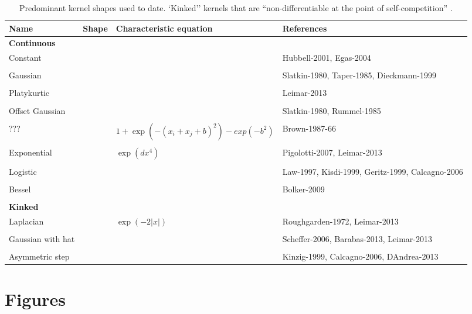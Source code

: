 \documentclass[a4paper,11pt]{article}
\begin{document}
\begin{table}[h]
 \caption{Predominant kernel shapes used to date.
`Kinked'' kernels that are ``non-differentiable at the point of
self-competition'' \citep{Barabas-2012}.}
\centering
{\footnotesize
  \begin{tabular}{p{3cm}p{4cm}p{3cm}p{4cm}}
  \hline
  Name & Shape & Characteristic equation & References \\
  \hline
  \multicolumn{4}{l}{\textbf{Continuous}} \\
  Constant & & & Hubbell-2001, Egas-2004 \\ \\
  Gaussian & & & Slatkin-1980, Taper-1985,
  Dieckmann-1999\\ \\
  Platykurtic & & &  Leimar-2013 \\ \\
  Offset Gaussian & & & Slatkin-1980, Rummel-1985\\ \\
  ??? & & $1 + \exp(-(x_i + x_j + b)^2) - exp(-b^2)$ & Brown-1987-66 \\ \\
  Exponential & & $\exp(dx^4)$ &Pigolotti-2007, Leimar-2013\\ \\
  Logistic & & & Law-1997, Kisdi-1999, Geritz-1999, Calcagno-2006\\ \\
  Bessel & & & Bolker-2009\\ \\
 \multicolumn{4}{l}{\textbf{Kinked}} \\
  Laplacian & & $\exp(-2|x|)$ & Roughgarden-1972, Leimar-2013 \\ \\
  Gaussian with hat & & & Scheffer-2006, Barabas-2013, Leimar-2013 \\ \\
  Asymmetric step & & & Kinzig-1999, Calcagno-2006, DAndrea-2013 \\
  \hline
  \end{tabular}
}
\label{tab:shapes}
\end{table}

\clearpage

\section{Figures}
\end{document}
